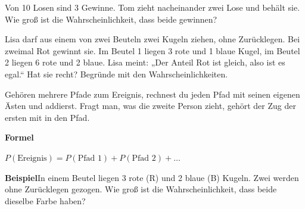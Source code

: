 \documentclass[11pt]{article}
\makeatletter
\newcommand{\aufg}[3]{\par\noindent\makebox[0pt][r]{#3}\begin{minipage}[t]{\linewidth}#1\end{minipage}\par}
\newcommand{\nr}[1]{\makebox[7mm][l]{\textbf{#1}}}
\newlength{\kr}
\newcommand{\karomerk}[2]{\protected@write\@auxout{}{\string\karoseite{#1}{#2}{\thepage}}}
\newcommand{\karoseite}[3]{\expandafter\xdef\csname karo@#1@#2\endcsname{#3}}
\makeatother
\begin{document}
\medskip
\aufg{\nr{3.}Von 10 Losen sind 3 Gewinne. Tom zieht nacheinander zwei Lose und behält sie. Wie groß ist die Wahrscheinlichkeit, dass beide gewinnen?}{}{}
\medskip
\aufg{\nr{4.}Lisa darf aus einem von zwei Beuteln zwei Kugeln ziehen, ohne Zurücklegen. Bei zweimal Rot gewinnt sie. Im Beutel 1 liegen 3 rote und 1 blaue Kugel, im Beutel 2 liegen 6 rote und 2 blaue. Lisa meint: „Der Anteil Rot ist gleich, also ist es egal.“ Hat sie recht? Begründe mit den Wahrscheinlichkeiten.}{}{{\scriptsize\color{mbgrau}Ziel\hspace{2mm}}}
\medskip
\par\vspace{3mm}\setlength{\kr}{\dimexpr\pagegoal-\pagetotal-10mm\relax}%
\ifdim\kr>12mm\karomerk{k}{A}\noindent{\scriptsize\color{mbgrau}Platz zum Rechnen}\par\nointerlineskip\vspace{1mm}\noindent
\begin{tikzpicture}\clip (0,0) rectangle ({\linewidth-0.5mm},\kr);\draw[black!16,line width=0.3pt,step=5mm] (0,0) grid (\linewidth,\kr);\end{tikzpicture}\fi\par
\clearpage\label{s:B}\noindent\colorbox{black!12}{}\hspace{3mm}{\Large\bfseries Mehrere Pfade, zweite Person}\par\smallskip
\noindent Gehören mehrere Pfade zum Ereignis, rechnest du jeden Pfad mit seinen eigenen Ästen und addierst. Fragt man, was die zweite Person zieht, gehört der Zug der ersten mit in den Pfad.\par\medskip
\noindent\textbf{Formel}\par\nopagebreak\noindent\hspace*{4mm}\begin{minipage}{\dimexpr\linewidth-4mm\relax}$P(\text{Ereignis}) = P(\text{Pfad 1}) + P(\text{Pfad 2}) + \ldots$\end{minipage}\par\medskip
\noindent\textbf{Beispiel}\quad In einem Beutel liegen 3 rote (R) und 2 blaue (B) Kugeln. Zwei werden ohne Zurücklegen gezogen. Wie groß ist die Wahrscheinlichkeit, dass beide dieselbe Farbe haben?\par\smallskip
\end{document}
